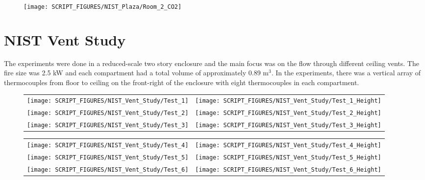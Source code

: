 \begin{figure}
\begin{center}
\texttt{[image: SCRIPT\_FIGURES/NIST\_Plaza/Room\_2\_CO2]}
\end{center}
\end{figure}

\clearpage

\section{NIST Vent Study}

The experiments were done in a reduced-scale two story enclosure and the main focus was on the flow through different ceiling vents. The fire size was 2.5 kW and each compartment had a total volume of approximately 0.89 m$^3$. In the experiments, there was a vertical array of thermocouples from floor to ceiling on the front-right of the enclosure with eight thermocouples in each compartment.

\begin{figure}[!ht]
\begin{tabular*}{\textwidth}{l@{\extracolsep{\fill}}r}
\texttt{[image: SCRIPT\_FIGURES/NIST\_Vent\_Study/Test\_1]} &
\texttt{[image: SCRIPT\_FIGURES/NIST\_Vent\_Study/Test\_1\_Height]} \\
\texttt{[image: SCRIPT\_FIGURES/NIST\_Vent\_Study/Test\_2]} &
\texttt{[image: SCRIPT\_FIGURES/NIST\_Vent\_Study/Test\_2\_Height]} \\
\texttt{[image: SCRIPT\_FIGURES/NIST\_Vent\_Study/Test\_3]} &
\texttt{[image: SCRIPT\_FIGURES/NIST\_Vent\_Study/Test\_3\_Height]}
\end{tabular*}
\end{figure}

\begin{figure}[!ht]
\begin{tabular*}{\textwidth}{l@{\extracolsep{\fill}}r}
\texttt{[image: SCRIPT\_FIGURES/NIST\_Vent\_Study/Test\_4]} &
\texttt{[image: SCRIPT\_FIGURES/NIST\_Vent\_Study/Test\_4\_Height]} \\
\texttt{[image: SCRIPT\_FIGURES/NIST\_Vent\_Study/Test\_5]} &
\texttt{[image: SCRIPT\_FIGURES/NIST\_Vent\_Study/Test\_5\_Height]} \\
\texttt{[image: SCRIPT\_FIGURES/NIST\_Vent\_Study/Test\_6]} &
\texttt{[image: SCRIPT\_FIGURES/NIST\_Vent\_Study/Test\_6\_Height]}
\end{tabular*}
\end{figure}

